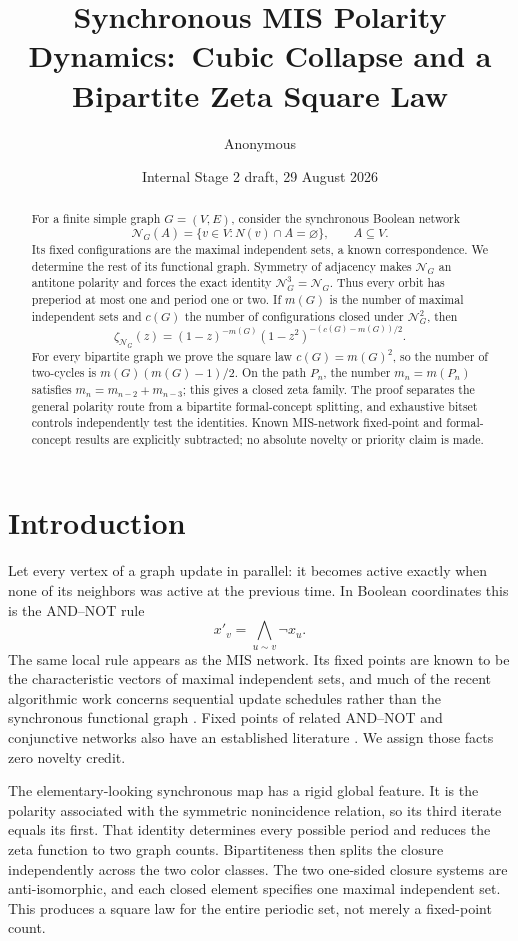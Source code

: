 \documentclass[11pt,a4paper]{amsart}
\title[MIS polarity dynamics]{Synchronous MIS Polarity Dynamics:\ Cubic Collapse and a Bipartite Zeta Square Law}
\author{Anonymous}
\date{Internal Stage 2 draft, 29 August 2026}
\theoremstyle{definition}
\theoremstyle{remark}
\begin{document}
\begin{abstract}
For a finite simple graph $G=(V,E)$, consider the synchronous Boolean
network
\[
 \mathcal N_G(A)=\{v\in V:N(v)\cap A=\varnothing\},\qquad A\subseteq V.
\]
Its fixed configurations are the maximal independent sets, a known
correspondence.  We determine the rest of its functional graph.  Symmetry of
adjacency makes $\mathcal N_G$ an antitone polarity and forces the exact
identity $\mathcal N_G^3=\mathcal N_G$.  Thus every orbit has preperiod at
most one and period one or two.  If $m(G)$ is the number of maximal
independent sets and $c(G)$ the number of configurations closed under
$\mathcal N_G^2$, then
\[
 \zeta_{\mathcal N_G}(z)
 =(1-z)^{-m(G)}(1-z^2)^{-(c(G)-m(G))/2}.
\]
For every bipartite graph we prove the square law $c(G)=m(G)^2$, so the
number of two-cycles is $m(G)(m(G)-1)/2$.  On the path $P_n$, the number
$m_n=m(P_n)$ satisfies $m_n=m_{n-2}+m_{n-3}$; this gives a closed zeta
family.  The proof separates the general polarity route from a bipartite
formal-concept splitting, and exhaustive bitset controls independently test
the identities.  Known MIS-network fixed-point and formal-concept results
are explicitly subtracted; no absolute novelty or priority claim is made.
\end{abstract}

\maketitle

\section{Introduction}

Let every vertex of a graph update in parallel: it becomes active exactly
when none of its neighbors was active at the previous time.  In Boolean
coordinates this is the AND--NOT rule
\[
 x'_v=\bigwedge_{u\sim v}\neg x_u.
\]
The same local rule appears as the MIS network.  Its fixed points are known
to be the characteristic vectors of maximal independent sets, and much of
the recent algorithmic work concerns sequential update schedules rather
than the synchronous functional graph \cite{GadouleauKutner2025}.  Fixed
points of related AND--NOT and conjunctive networks also have an established
literature \cite{Aracena2004,AracenaRichardSalinas2017}.  We assign those facts zero
novelty credit.

The elementary-looking synchronous map has a rigid global feature.  It is
the polarity associated with the symmetric nonincidence relation, so its
third iterate equals its first.  That identity determines every possible
period and reduces the zeta function to two graph counts.  Bipartiteness
then splits the closure independently across the two color classes.  The
two one-sided closure systems are anti-isomorphic, and each closed element
specifies one maximal independent set.  This produces a square law for the
entire periodic set, not merely a fixed-point count.
\end{document}
